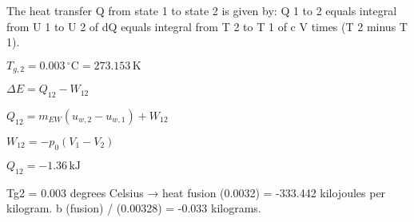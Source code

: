 The heat transfer Q from state 1 to state 2 is given by:  
Q 1 to 2 equals integral from U 1 to U 2 of dQ equals integral from T 2 to T 1 of c V times (T 2 minus T 1).

\( T_{g,2} = 0.003 \, ^\circ \text{C} = 273.153 \, \text{K} \)  

\( \Delta E = Q_{12} - W_{12} \)  

\( Q_{12} = m_{EW} (u_{w,2} - u_{w,1}) + W_{12} \)  

\( W_{12} = - p_0 (V_{1} - V_{2}) \)  

\( Q_{12} = -1.36 \, \text{kJ} \)

Tg2 = 0.003 degrees Celsius → heat fusion (0.0032) = -333.442 kilojoules per kilogram.  
b (fusion) / (0.00328) = -0.033 kilograms.